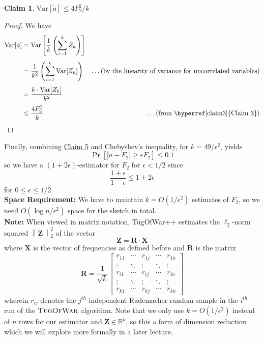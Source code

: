 \documentclass[11pt]{article}
\newtheorem{claim}{Claim}
\newcommand{\Var}{\mathrm{Var}}
\renewcommand{\vec}[1]{\bm{#1}}
\newcommand{\abs}[1]{\left| #1 \right|}
\newcommand{\norm}[1]{\left\lVert#1\right\rVert}
\begin{document}
\begin{claim} \label{claim5}
	$\Var[\tilde{a}] \leq 4 F_2^2 / k$
\end{claim}
\begin{proof}
We have
\begin{align*}
\Var[\tilde{a}] &= \Var \left[ \frac{1}{k} \left(\sum_{i=1}^{k}Z_k \right) \right] \\[4pt]
&= \frac{1}{k^2} \left( \sum_{i=1}^{k} \Var[Z_k]\right)  & \textrm{\dots (by the linearity of variance for uncorrelated variables)} \\[4pt]
&= \frac{k \cdot \Var[Z_k]}{k^2} \\[3pt]
&\leq \frac{4F_2^2}{k} & \textrm{\dots (from \hyperref[claim3]{Claim 3})}
\end{align*}
\end{proof}

\noindent Finally, combining \hyperref[claim5]{Claim 5} and Chebyshev's inequality, for $k = 49 / \epsilon^2$, yields
\[
	\Pr \left[ \abs{\tilde{a} - F_2} \geq \epsilon F_2 \right] \leq 0.1
\]
so we have a $(1 + 2\epsilon)$-estimator for $F_2$ for $\epsilon < 1/2$ since
\[
\frac{1+\epsilon}{1-\epsilon} \leq 1 + 2\epsilon
\]
for $0  \leq \epsilon \leq 1/2$. \\ 

\noindent \textbf{Space Requirement:} We have to maintain $k = O(1/\epsilon^2)$ estimates of $F_2$, so we need $O(\log n / \epsilon^2)$ space for the sketch in total. \\

\noindent \textbf{Note:} When viewed in matrix notation, \mbox{\sc TugOfWar++} estimates the $\ell_2$-norm squared $\norm{\vec{Z}}_2^2$ of the vector 
\[
	\vec{Z} = \vec{R} \cdot \vec{X}
\] 
where $\vec{X}$ is the vector of frequencies as defined before and $\vec{R}$ is the matrix
\[
	\vec{R} = \frac{1}{\sqrt{k}} \begin{bmatrix}
	r_{11} & \cdots & r_{1j} &  \cdots & r_{1n} \\
	\vdots & \ddots & \vdots & \ddots & \vdots \\
	r_{i1} & \cdots & r_{ij} & \cdots & r_{in} \\
	\vdots & \ddots & \vdots & \ddots & \vdots \\
	r_{k1} & \cdots & r_{kj} & \cdots & r_{kn}
	\end{bmatrix}
\]
wherein $r_{ij}$ denotes the $j^{th}$ independent Rademacher random sample in the $i^{th}$ run of the $\mbox{\sc TugOfWar}$ algorithm. Note that we only use $k = O(1/\epsilon^2)$ instead of $n$ rows for our estimator and $\vec{Z} \in \mathbb{R}^k$, so this a form of dimension reduction which we will explore more formally in a later lecture.
\end{document}
